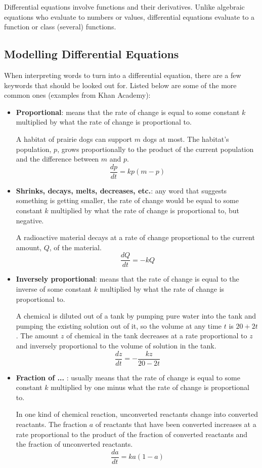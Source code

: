 \documentclass[12pt]{article}
\begin{document}
Differential equations involve functions and their derivatives. Unlike algebraic equations who evaluate to numbers or values, differential equations evaluate to a function or class (several) functions.

\subsection{Modelling Differential Equations}
When interpreting words to turn into a differential equation, there are a few keywords that should be looked out for. Listed below are some of the more common ones (examples from Khan Academy):

\begin{itemize}
    \item \textbf{Proportional}: means that the rate of change is equal to some constant $k$ multiplied by what the rate of change is proportional to.
          \bigskip

          \noindent A habitat of prairie dogs can support $m$ dogs at most. The habitat's population, $p$, grows proportionally to the product of the current population and the difference between $m$ and $p$.
          \[ \frac{dp}{dt} = kp(m-p) \]

    \item \textbf{Shrinks, decays, melts, decreases, etc.}: any word that suggests something is getting smaller, the rate of change would be equal to some constant $k$ multiplied by what the rate of change is proportional to, but negative.
          \bigskip

          \noindent A radioactive material decays at a rate of change proportional to the current amount, $Q$, of the material.
          \[ \frac{dQ}{dt} = -kQ \]

    \item \textbf{Inversely proportional}: means that the rate of change is equal to the inverse of some constant $k$ multiplied by what the rate of change is proportional to.
          \bigskip

          \noindent A chemical is diluted out of a tank by pumping pure water into the tank and pumping the existing solution out of it, so the volume at any time $t$ is $20+2t$. The amount $z$ of chemical in the tank decreases at a rate proportional to $z$ and inversely proportional to the volume of solution in the tank.
          \[ \frac{dz}{dt} = -\frac{kz}{20-2t} \]

    \item \textbf{Fraction of ... }: usually means that the rate of change is equal to some constant $k$ multiplied by one minus what the rate of change is proportional to.
          \bigskip

          \noindent In one kind of chemical reaction, unconverted reactants change into converted reactants. The fraction $a$ of reactants that have been converted increases at a rate proportional to the product of the fraction of converted reactants and the fraction of unconverted reactants.
          \[ \frac{da}{dt} = ka(1-a) \]
\end{itemize}
\end{document}
